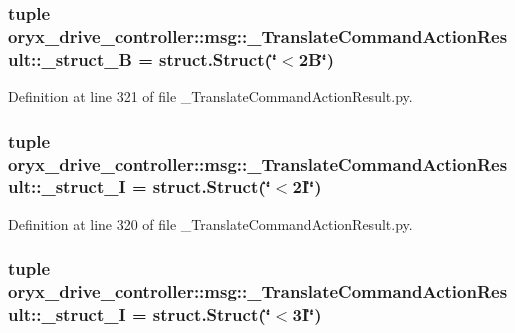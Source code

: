 \subsubsection[{\-\_\-struct\-\_\-2\-B}]{\setlength{\rightskip}{0pt plus 5cm}tuple {\bf oryx\-\_\-drive\-\_\-controller\-::msg\-::\-\_\-\-Translate\-Command\-Action\-Result\-::\-\_\-struct\-\_\-B} = struct.\-Struct(\char`\"{}$<$2\-B\char`\"{})}\label{namespaceoryx__drive__controller_1_1msg_1_1__TranslateCommandActionResult_a3f0165704a4675ca2f5de0e7bfc7d107}


\-Definition at line 321 of file \-\_\-\-Translate\-Command\-Action\-Result.\-py.

\subsubsection[{\-\_\-struct\-\_\-2\-I}]{\setlength{\rightskip}{0pt plus 5cm}tuple {\bf oryx\-\_\-drive\-\_\-controller\-::msg\-::\-\_\-\-Translate\-Command\-Action\-Result\-::\-\_\-struct\-\_\-I} = struct.\-Struct(\char`\"{}$<$2\-I\char`\"{})}\label{namespaceoryx__drive__controller_1_1msg_1_1__TranslateCommandActionResult_a493a1e7589e7674b34ac4d6e3a9a0165}


\-Definition at line 320 of file \-\_\-\-Translate\-Command\-Action\-Result.\-py.

\subsubsection[{\-\_\-struct\-\_\-3\-I}]{\setlength{\rightskip}{0pt plus 5cm}tuple {\bf oryx\-\_\-drive\-\_\-controller\-::msg\-::\-\_\-\-Translate\-Command\-Action\-Result\-::\-\_\-struct\-\_\-I} = struct.\-Struct(\char`\"{}$<$3\-I\char`\"{})}\label{namespaceoryx__drive__controller_1_1msg_1_1__TranslateCommandActionResult_a975328a78edc13c1e8e01ca4eda16688}



